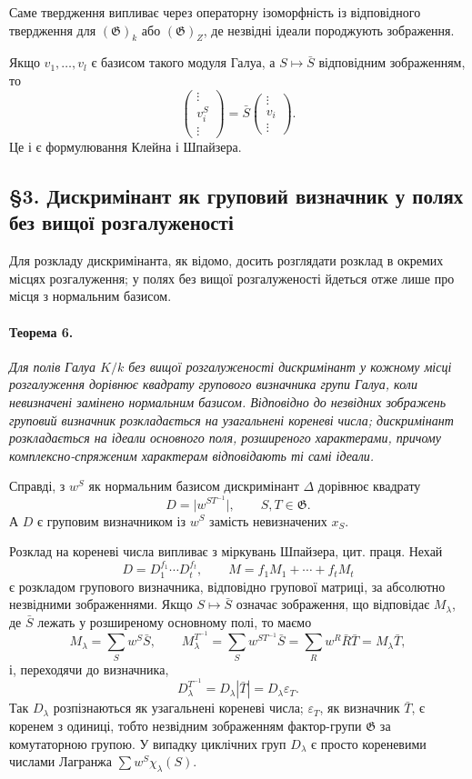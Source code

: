 \documentclass[11pt]{article}
\providecommand{\Gg}{\mathfrak{G}}
\begin{document}
Саме твердження випливає через операторну ізоморфність із відповідного твердження для \((\Gg)_k\) або \((\Gg)_Z\), де незвідні ідеали породжують зображення.

Якщо \(v_1,\ldots,v_l\) є базисом такого модуля Галуа, а \(S\mapsto \bar S\) відповідним зображенням, то
\[
        \begin{pmatrix}\vdots\\ v_i^S\\ \vdots\end{pmatrix}
        =\bar S\begin{pmatrix}\vdots\\ v_i\\ \vdots\end{pmatrix}.
\]
Це і є формулювання Клейна і Шпайзера.

\subsection*{§3. Дискримінант як груповий визначник у полях без вищої розгалуженості}

Для розкладу дискримінанта, як відомо, досить розглядати розклад в окремих місцях розгалуження; у полях без вищої розгалуженості йдеться отже лише про місця з нормальним базисом.

\paragraph{Теорема 6.}
\emph{Для полів Галуа \(K/k\) без вищої розгалуженості дискримінант у кожному місці розгалуження дорівнює квадрату групового визначника групи Галуа, коли невизначені замінено нормальним базисом. Відповідно до незвідних зображень груповий визначник розкладається на узагальнені кореневі числа; дискримінант розкладається на ідеали основного поля, розширеного характерами, причому комплексно-спряженим характерам відповідають ті самі ідеали.}

Справді, з \(w^S\) як нормальним базисом дискримінант \(\Delta\) дорівнює квадрату
\[
        D=\bigl|w^{ST^{-1}}\bigr|,\qquad S,T\in\Gg.
\]
А \(D\) є груповим визначником із \(w^S\) замість невизначених \(x_S\).

Розклад на кореневі числа випливає з міркувань Шпайзера, цит. праця. Нехай
\[
        D=D_1^{f_1}\cdots D_t^{f_t},
        \qquad
        M=f_1M_1+\cdots+f_tM_t
\]
є розкладом групового визначника, відповідно групової матриці, за абсолютно незвідними зображеннями. Якщо \(S\mapsto\bar S\) означає зображення, що відповідає \(M_\lambda\), де \(\bar S\) лежать у розширеному основному полі, то маємо
\[
        M_\lambda=\sum_S w^S\bar S,
        \qquad
        M_\lambda^{T^{-1}}=\sum_S w^{ST^{-1}}\bar S
          =\sum_R w^R\bar R\bar T=M_\lambda\bar T,
\]
і, переходячи до визначника,
\[
        D_\lambda^{T^{-1}}=D_\lambda|\bar T|=D_\lambda\varepsilon_T.
\]
Так \(D_\lambda\) розпізнаються як узагальнені кореневі числа; \(\varepsilon_T\), як визначник \(\bar T\), є коренем з одиниці, тобто незвідним зображенням фактор-групи \(\Gg\) за комутаторною групою. У випадку циклічних груп \(D_\lambda\) є просто кореневими числами Лагранжа \(\sum w^S\chi_\lambda(S)\).
\end{document}
